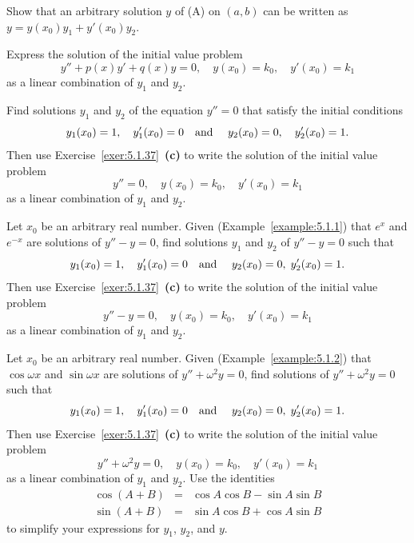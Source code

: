 \begin{exerciselist}
\begin{alist}
    \item %
    Show that an arbitrary solution $y$ of (A) on $(a,b)$ can be written as
    $y=y(x_{0})y_{1}+y'(x_{0})y_{2}$.

    \item %
    Express the solution of the initial value problem
    \[
      y''+p(x)y'+q(x)y=0,\quad y(x_{0})=k_{0},\quad y'(x_{0})=k_{1}
    \]
    as a linear combination of $y_{1}$ and $y_{2}$.
  \end{alist}

  \item\label{exer:5.1.38} Find solutions $y_{1}$ and $y_{2}$ of the equation $y''=0$ that satisfy
        the initial conditions
  \[
    y_{1}(x_{0})=1,\quad y'_{1}(x_{0})=0\mbox{\quad and \quad}y_{2}(x_{0})=0, \quad y'_{2}(x_{0})=1.
  \]
  Then use Exercise~\ref{exer:5.1.37}~{\bf (c)} to write the solution of the initial value problem
  \[
    y''=0,\quad y(x_{0})=k_{0},\quad y'(x_{0})=k_{1}
  \]
  as a linear combination of $y_{1}$ and $y_{2}$.

  \item\label{exer:5.1.39} Let $x_{0}$ be an arbitrary real number. Given
        (Example~\ref{example:5.1.1}) that $e^{x}$ and $e^{-x}$ are solutions of $y''-y=0$, find
        solutions $y_{1}$ and $y_{2}$ of $y''-y=0$ such that
  \[
    y_{1}(x_{0})=1,\quad y'_{1}(x_{0})=0\mbox{\quad and \quad}y_{2}(x_{0})=0,\;y'_{2}(x_{0})=1.
  \]
  Then use Exercise~\ref{exer:5.1.37}~{\bf (c)} to write the solution of the initial value problem
  \[
    y''-y=0,\quad y(x_{0})=k_{0},\quad y'(x_{0})=k_{1}
  \]
  as a linear combination of $y_{1}$ and $y_{2}$.

  \item\label{exer:5.1.40} Let $x_{0}$ be an arbitrary real number. Given
        (Example~\ref{example:5.1.2}) that $\cos\omega x$ and $\sin\omega x$ are solutions of
        $y''+\omega^{2}y=0$, find solutions of $y''+\omega^{2}y=0$ such that
  \[
    y_{1}(x_{0})=1,\quad y'_{1}(x_{0})=0\mbox{\quad and \quad}y_{2}(x_{0})=0,\;y'_{2}(x_{0})=1.
  \]
  Then use Exercise~\ref{exer:5.1.37}~{\bf (c)} to write the solution of the initial value problem
  \[
    y''+\omega^{2}y=0,\quad y(x_{0})=k_{0},\quad y'(x_{0})=k_{1}
  \]
  as a linear combination of $y_{1}$ and $y_{2}$. Use the identities
  \begin{eqnarray*}
    \cos(A+B) & = & \cos A\cos B-\sin A\sin B \\
    \sin(A+B) & = & \sin A\cos B+\cos A\sin B
  \end{eqnarray*}
  to simplify your expressions for $y_{1}$, $y_{2}$, and $y$.


\end{exerciselist}
